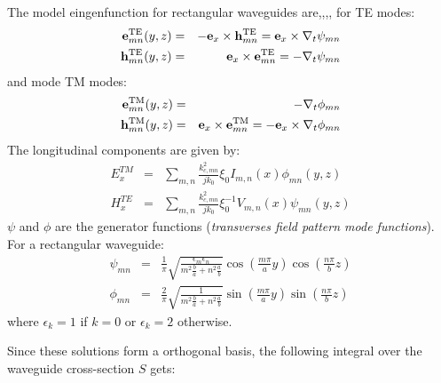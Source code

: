 The model eingenfunction for rectangular waveguides are\cite[§2.2]{marcuvitz1951},\cite[§8.1,§8.2]{Harrington2001},\cite[§5.4]{Collin1990},\cite[§3.3]{pozar2012},\cite[Appendix A]{Bers1981} for TE modes:
\begin{eqnarray}
\mathbf{e}_{mn}^{{\mathrm{TE}}}(y,z) & = & -{\mathbf e}_x \times \mathbf{h}_{mn}^{{\mathrm{TE}}} = {\mathbf e}_x \times \nabla_{t} \psi_{mn}\\
\mathbf{h}_{mn}^{{\mathrm{TE}}}(y,z) & = &  {\mathbf e}_x \times \mathbf{e}_{mn}^{{\mathrm{TE}}} = -\nabla_{t} \psi_{mn}
\label{eq:TEmodes_eingenfunctions}
\end{eqnarray}
and mode TM modes:
\begin{eqnarray}
\mathbf{e}_{mn}^{{\mathrm{TM}}}(y,z) & = & -\nabla_{t}\phi_{mn}\\
\mathbf{h}_{mn}^{{\mathrm{TM}}}(y,z) & = & {\mathbf e}_x \times\mathbf{e}_{mn}^{{\mathrm{TM}}}= -{\mathbf e}_x \times\nabla_{t}\phi_{mn}
\label{eq:TMmodes_eingenfunctions}
\end{eqnarray}
The longitudinal components are given by:
\begin{eqnarray}
E_{x}^{TM} & = & \sum_{m,n}\frac{k_{c,mn}^{2}}{j k_{0}}\xi_0 I_{m,n}(x)\phi_{mn}(y,z)\\
H_{x}^{TE} & = & \sum_{m,n}\frac{k_{c,mn}^{2}}{j k_{0}}\xi_0^{-1} V_{m,n}(x)\psi_{mn}(y,z)
\label{eq:TETM_longitudinal_components}
\end{eqnarray}
$\psi$ and $\phi$ are the generator functions (\emph{transverses field pattern mode functions}). For a rectangular waveguide\cite[Table 8.1]{Harrington2001}\cite[§1.2 (6.c),§2.2]{marcuvitz1951}\cite[Appendix A, A13-14]{Bers1981}:
\begin{eqnarray}
\psi_{mn} & = & \frac{1}{\pi}\sqrt{\frac{\epsilon_{m}\epsilon_{n}}{m^{2}\frac{b}{a}+n^{2}\frac{a}{b}}}\cos\left(\frac{m\pi}{a}y\right)\cos\left(\frac{n\pi}{b}z\right)\label{eq:fonction_generatrice_TE}\\
\phi_{mn} & = & \frac{2}{\pi}\sqrt{\frac{1}{m^{2}\frac{b}{a}+n^{2}\frac{a}{b}}}\sin\left(\frac{m\pi}{a}y\right)\sin\left(\frac{n\pi}{b}z\right)\label{eq:fonction_generatrice_TM}
\end{eqnarray}
where $\epsilon_{k}=1$ if $k=0$ or $\epsilon_{k}=2$ otherwise.

Since these solutions form a orthogonal basis, the following integral over the waveguide cross-section $S$ gets\cite{marcuvitz1951,Collin1990}:


